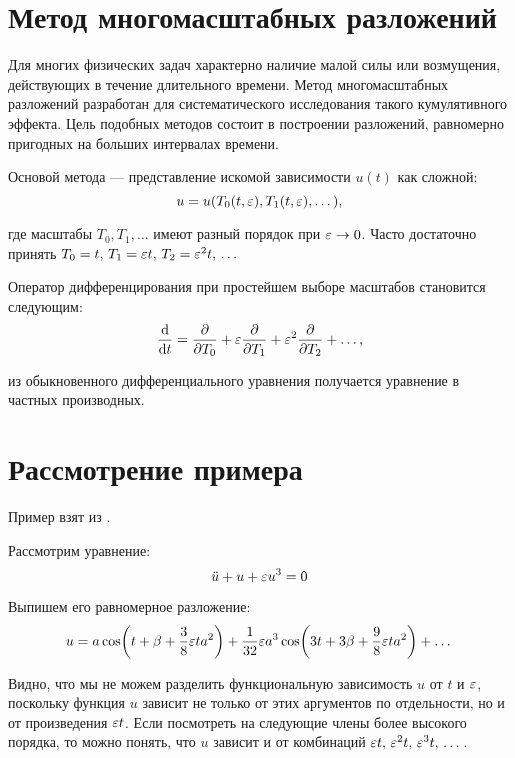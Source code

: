 \chapter*{Метод многомасштабных разложений}

Для многих физических задач характерно
наличие малой силы или возмущения,
действующих в течение длительного времени.
Метод многомасштабных разложений разработан
для систематического исследования
такого кумулятивного эффекта.
Цель подобных методов состоит
в построении разложений,
равномерно пригодных на больших интервалах времени.
\cite{coul1972}

Основой метода --- представление
искомой зависимости $u(t)$ как сложной:
\begin{equation*}
    u = u(T_0(t, \varepsilon), T_1(t, \varepsilon), \dots),
\end{equation*}

где масштабы $T_0, T_1, \dots$
имеют разный порядок при $\varepsilon \to 0$.
Часто достаточно принять
$T_0 = t, \, T_1 = \varepsilon t, \, T_2 = \varepsilon^2 t, \, \dots$

Оператор дифференцирования при простейшем выборе масштабов
становится следующим:
\begin{equation*}
    \dv{}{t} = \pdv{}{T_0} + \varepsilon \pdv{}{T_1} +
    \varepsilon^2 \pdv{}{T_2} + \dots,
\end{equation*}

из обыкновенного дифференциального уравнения
получается уравнение в частных производных.

\chapter*{Рассмотрение примера}

Пример взят из \cite{nayfeh1984}.

Рассмотрим уравнение:
\begin{equation} \label{Eq:example}
    \ddot{u} + u + \varepsilon u^3 = 0
\end{equation}

Выпишем его равномерное разложение:
\begin{equation*}
    u = a \cos(t + \beta + \frac{3}{8} \varepsilon t a^2) +
    \frac{1}{32} \varepsilon a^3
    \cos(3 t + 3 \beta + \frac{9}{8} \varepsilon t a^2) + \dots
\end{equation*}

Видно, что мы не можем разделить
функциональную зависимость $u$ от $t$ и $\varepsilon$,
поскольку функция $u$ зависит не только от этих аргументов
по отдельности, но и от произведения $\varepsilon t$.
Если посмотреть на следующие члены более высокого порядка,
то можно понять, что $u$ зависит и от комбинаций
$\varepsilon t, \, \varepsilon^2 t, \, \varepsilon^3 t, \, \dots$.

